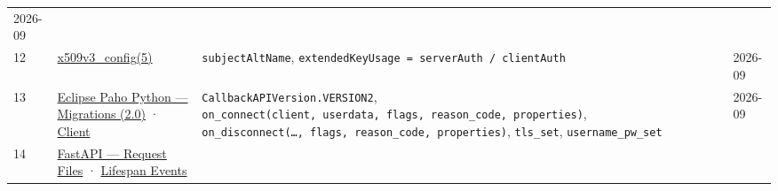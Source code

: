 \begin{longtable}[]{@{}llll@{}}
\begin{minipage}[t]{0.22\columnwidth}
2026-09\strut
\end{minipage}\tabularnewline
\begin{minipage}[t]{0.22\columnwidth}\raggedright
12\strut
\end{minipage} & \begin{minipage}[t]{0.22\columnwidth}\raggedright
\href{https://docs.openssl.org/3.0/man5/x509v3_config/}{x509v3\_config(5)}\strut
\end{minipage} & \begin{minipage}[t]{0.22\columnwidth}\raggedright
\texttt{subjectAltName}, \texttt{extendedKeyUsage\ =\allowbreak{}\ serverAuth\ /\allowbreak{}\ clientAuth}\strut
\end{minipage} & \begin{minipage}[t]{0.22\columnwidth}\raggedright
2026-09\strut
\end{minipage}\tabularnewline
\begin{minipage}[t]{0.22\columnwidth}\raggedright
13\strut
\end{minipage} & \begin{minipage}[t]{0.22\columnwidth}\raggedright
\href{https://eclipse.dev/paho/files/paho.mqtt.python/html/migrations.html}{Eclipse Paho Python --- Migrations (2.\allowbreak{}0)} · \href{https://eclipse.dev/paho/files/paho.mqtt.python/html/client.html}{Client}\strut
\end{minipage} & \begin{minipage}[t]{0.22\columnwidth}\raggedright
\texttt{CallbackAPIVersion.\allowbreak{}VERSION2}, \texttt{on\_\allowbreak{}connect(client,\ userdata,\ flags,\ reason\_\allowbreak{}code,\ properties)}, \texttt{on\_\allowbreak{}disconnect(\ldots{},\ flags,\ reason\_\allowbreak{}code,\ properties)}, \texttt{tls\_set}, \texttt{username\_\allowbreak{}pw\_\allowbreak{}set}\strut
\end{minipage} & \begin{minipage}[t]{0.22\columnwidth}\raggedright
2026-09\strut
\end{minipage}\tabularnewline
\begin{minipage}[t]{0.22\columnwidth}\raggedright
14\strut
\end{minipage} & \begin{minipage}[t]{0.22\columnwidth}\raggedright
\href{https://fastapi.tiangolo.com/tutorial/request-files/}{FastAPI --- Request Files} · \href{https://fastapi.tiangolo.com/advanced/events/}{Lifespan Events}\strut
\end{minipage} & \begin{minipage}[t]{0.22\columnwidth}\raggedright

\end{minipage}
\end{longtable}

